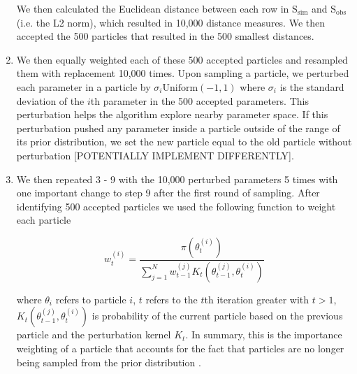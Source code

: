 \documentclass[a4paper]{article}
\begin{document}
\begin{enumerate}
  We then calculated the Euclidean distance between each row in S$_\text{sim}$
  and S$_\text{obs}$ (i.e. the L2 norm), which resulted in 10,000 distance
  measures. We then accepted the 500 particles that resulted in the
  500 smallest distances.
\item
  We then equally weighted each of these 500 accepted particles and
  resampled them with replacement 10,000 times. Upon sampling a
  particle, we perturbed each parameter in a particle by
 $\sigma_i \text{Uniform}(-1, 1)$ where $\sigma_i$ is the standard
  deviation of the $i$th parameter in the 500 accepted parameters. This
  perturbation helps the algorithm explore nearby parameter space. If this perturbation pushed any parameter inside a particle outside of the range of its prior distribution, we set the new particle equal to the old particle without perturbation [POTENTIALLY IMPLEMENT DIFFERENTLY].
\item
  We then repeated 3 - 9 with the 10,000 perturbed parameters 5
  times with one important change to step 9 after the first round of
  sampling. After identifying 500 accepted particles we used the
  following function to weight each particle \citep{Toni2009}

  \begin{equation}
    w_t^{(i)} = \dfrac{\pi(\theta_t^{(i)})}{\sum_{j = 1}^N w_{t - 1}^{(j)} K_t(\theta_{t - 1}^{(j)}, \theta_t^{(i)})}
  \end{equation}

  where $\theta_i$ refers to particle $i$, $t$ refers to the $t$th iteration greater with $t > 1$,  $K_t(\theta_{t - 1}^{(j)}, \theta_t^{(i)})$ is probability of the current particle based on the previous particle and the perturbation kernel $K_t$. 
  In summary, this is the
  importance weighting of a particle that accounts for the fact that
  particles are no longer being sampled from the prior distribution \citep{Beaumont2010}.
\end{enumerate}




\end{document}
